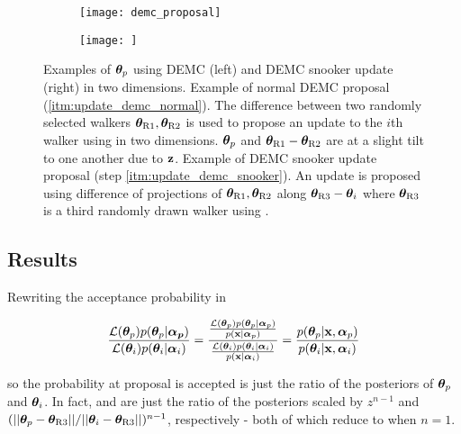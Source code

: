 \begin{figure}
\centering
\begin{subfigure}[t]{0.5\textwidth}
\centering
\texttt{[image: demc\_proposal]}
\end{subfigure}%
\begin{subfigure}[t]{0.5\textwidth}
\centering
\texttt{[image: ]}
\end{subfigure}
\caption{Examples of $\boldsymbol{\theta}_p$ using DEMC (left) and DEMC snooker update (right) in two dimensions.  Example of normal DEMC
proposal (\ref{itm:update_demc_normal}).  The difference between two randomly selected walkers
$\boldsymbol{\theta}_{\mathrm{R1}}, \boldsymbol{\theta}_{\mathrm{R2}}$ is used to propose an update to the $i$th walker using
 in two dimensions.  $\boldsymbol{\theta}_p$ and
$\boldsymbol{\theta}_{\mathrm{R1}} - \boldsymbol{\theta}_{\mathrm{R2}}$ are at a slight tilt to one another due to $\mathbf{z}$.  Example
of DEMC snooker update proposal (step \ref{itm:update_demc_snooker}).  An update is proposed using difference of projections of
$\boldsymbol{\theta}_{\mathrm{R1}}, \boldsymbol{\theta}_{\mathrm{R2}}$ along $\boldsymbol{\theta}_{\mathrm{R3}} - \boldsymbol{\theta}_i$ where
$\boldsymbol{\theta}_{\mathrm{R3}}$ is a third randomly drawn walker using .}
\label{fig:elifetime_fit_mcmc_demc_diagram}
\end{figure}



\subsection{Results}
\label{subsec:elifetime_fit_results}
Rewriting the acceptance probability in 

\begin{equation}
\frac{\mathcal{L}(\boldsymbol{\theta}_p) p(\boldsymbol{\theta}_p|\boldsymbol{\alpha_p})}
{\mathcal{L}(\boldsymbol{\theta}_i) p(\boldsymbol{\theta}_i|\boldsymbol{\alpha}_i)} =
\dfrac{\frac{\mathcal{L}(\boldsymbol{\theta}_p) p(\boldsymbol{\theta}_p|\boldsymbol{\alpha}_p)}{p(\mathbf{x}|\boldsymbol{\alpha}_p)}}
{\frac{\mathcal{L}(\boldsymbol{\theta}_i) p(\boldsymbol{\theta}_i|\boldsymbol{\alpha}_i)}{p(\mathbf{x}|\boldsymbol{\alpha}_i)}} =
\frac{p(\boldsymbol{\theta}_p|\mathbf{x}, \boldsymbol{\alpha}_p)}{p(\boldsymbol{\theta}_i|\mathbf{x}, \boldsymbol{\alpha}_i)}
\label{eq:elifetime_fit_mcmc_acc_ratio}
\end{equation}

\noindent so the probability at proposal is accepted is just the ratio of the posteriors of $\boldsymbol{\theta}_p$ and
$\boldsymbol{\theta}_i$.  In fact,  and
 are just the ratio of the posteriors scaled by $z^{n-1}$ and
$(||\boldsymbol{\theta}_p - \boldsymbol{\theta}_{\mathrm{R3}}|| / ||\boldsymbol{\theta}_i - \boldsymbol{\theta}_{\mathrm{R3}}||)^{n - 1}$, respectively - both
of which reduce to  when $n = 1$.

